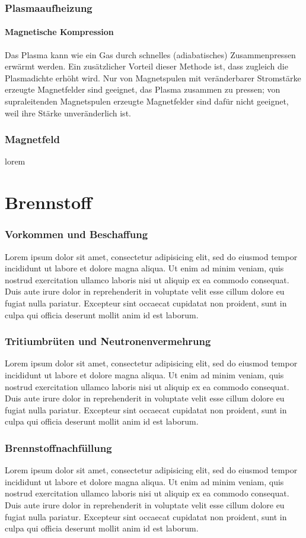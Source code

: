\documentclass[aspectratio=169]{beamer}
\begin{document}
    \begin{frame}
      \frametitle{Plasmaaufheizung}
      \framesubtitle{Magnetische Kompression}
      Das Plasma kann wie ein Gas durch schnelles (adiabatisches) Zusammenpressen erwärmt werden. Ein zusätzlicher Vorteil dieser Methode ist, dass zugleich die Plasmadichte erhöht wird. Nur von Magnetspulen mit veränderbarer Stromstärke erzeugte Magnetfelder sind geeignet, das Plasma zusammen zu pressen; von supraleitenden Magnetspulen erzeugte Magnetfelder sind dafür nicht geeignet, weil ihre Stärke unveränderlich ist.
    \end{frame}

    \begin{frame}
      \frametitle{Magnetfeld}
      lorem
    \end{frame}

  \section{Brennstoff}

    \begin{frame}
      \frametitle{Vorkommen und Beschaffung}
      Lorem ipsum dolor sit amet, consectetur adipisicing elit, sed do eiusmod tempor incididunt ut labore et dolore magna aliqua. Ut enim ad minim veniam, quis nostrud exercitation ullamco laboris nisi ut aliquip ex ea commodo consequat. Duis aute irure dolor in reprehenderit in voluptate velit esse cillum dolore eu fugiat nulla pariatur. Excepteur sint occaecat cupidatat non proident, sunt in culpa qui officia deserunt mollit anim id est laborum.
    \end{frame}

    \begin{frame}
      \frametitle{Tritiumbrüten und Neutronenvermehrung}
      Lorem ipsum dolor sit amet, consectetur adipisicing elit, sed do eiusmod tempor incididunt ut labore et dolore magna aliqua. Ut enim ad minim veniam, quis nostrud exercitation ullamco laboris nisi ut aliquip ex ea commodo consequat. Duis aute irure dolor in reprehenderit in voluptate velit esse cillum dolore eu fugiat nulla pariatur. Excepteur sint occaecat cupidatat non proident, sunt in culpa qui officia deserunt mollit anim id est laborum.
    \end{frame}

    \begin{frame}
      \frametitle{Brennstoffnachfüllung}
      Lorem ipsum dolor sit amet, consectetur adipisicing elit, sed do eiusmod tempor incididunt ut labore et dolore magna aliqua. Ut enim ad minim veniam, quis nostrud exercitation ullamco laboris nisi ut aliquip ex ea commodo consequat. Duis aute irure dolor in reprehenderit in voluptate velit esse cillum dolore eu fugiat nulla pariatur. Excepteur sint occaecat cupidatat non proident, sunt in culpa qui officia deserunt mollit anim id est laborum.
    \end{frame}
\end{document}
